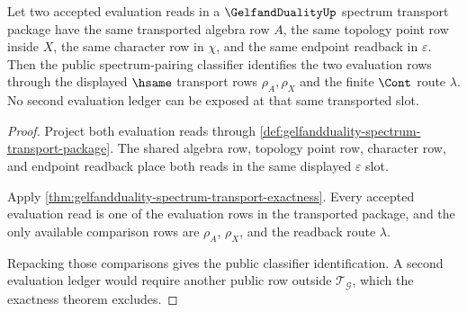 \begin{theorem}
\label{thm:gelfandduality-evaluation-ledger-determinacy}
Let two accepted evaluation reads in a $\GelfandDualityUp$ spectrum transport
package have the same transported algebra row $A$, the same topology point row
inside $X$, the same character row in $\chi$, and the same endpoint readback in
$\varepsilon$. Then the public spectrum-pairing classifier identifies the two
evaluation rows through the displayed $\hsame$ transport rows
$\rho_{A},\rho_{X}$ and the finite $\Cont$ route $\lambda$. No second
evaluation ledger can be exposed at that same transported slot.
\end{theorem}
\begin{proof}
Project both evaluation reads through
\autoref{def:gelfandduality-spectrum-transport-package}. The shared algebra
row, topology point row, character row, and endpoint readback place both reads
in the same displayed $\varepsilon$ slot.

Apply \autoref{thm:gelfandduality-spectrum-transport-exactness}. Every accepted
evaluation read is one of the evaluation rows in the transported package, and
the only available comparison rows are $\rho_{A}$, $\rho_{X}$, and the
readback route $\lambda$.

Repacking those comparisons gives the public classifier identification. A
second evaluation ledger would require another public row outside
$\mathcal{T}_{\mathcal{G}}$, which the exactness theorem excludes.
\end{proof}

